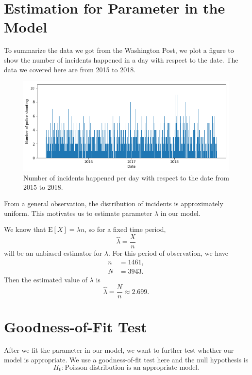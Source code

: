 \documentclass[11pt,a4paper,english]{article}
\begin{document}
\section{Estimation for Parameter in the Model}
To summarize the data we got from the Washington Post, we plot a figure to show the number of incidents happened in a day with respect to the date. The data we covered here are from 2015 to 2018.
\begin{figure}[htbp]
	\centering
	\includegraphics[width=\textwidth]{1.png}
    \caption{Number of incidents happened per day with respect to the date from 2015 to 2018.}
\end{figure}

From a general observation, the distribution of incidents is approximately uniform. This motivates us to estimate parameter $\lambda$ in our model.

We know that $\text{E}[X] = \lambda n$, so for a fixed time period,
\begin{equation*}
	\hat{\lambda} = \frac{X}{n}
\end{equation*}
will be an unbiased estimator for $\lambda$. For this period of observation, we have 
\begin{align*}
	n &= 1461,\\
	N &= 3943.
\end{align*}
Then the estimated value of $\lambda$ is
\begin{equation*}
	\hat{\lambda} = \frac{N}{n} \approx 2.699.
\end{equation*}

\section{Goodness-of-Fit Test}
After we fit the parameter in our model, we want to further test whether our model is appropriate. We use a goodness-of-fit test here and the null hypothesis is
\begin{equation*}
	H_{0}:\text{Poisson distribution is an appropriate model.}
\end{equation*}
\end{document}
